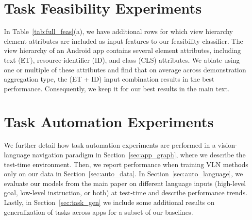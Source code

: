 \section{Task Feasibility Experiments}
\label{sec:feas}
In Table~\ref{tab:full_feas}(a), we have additional rows for which view hierarchy element attributes are included as input features to our feasibility classifier. The view hierarchy of an Android app contains several element attributes, including text (ET), resource-identifier (ID), and class (CLS) attributes. We ablate using one or multiple of these attributes and find that on average across demonstration aggregation type, the (ET + ID) input combination results in the best performance. Consequently, we keep it for our best results in the main text.

\section{Task Automation Experiments}
We further detail how task automation experiments are performed in a vision-language navigation paradigm in Section~\ref{sec:app_graph}, where we describe the test-time environment. Then, we report performance when training VLN methods only on our data in Section~\ref{sec:auto_data}. In Section~\ref{sec:auto_language}, we evaluate our models from the main paper on different language inputs (high-level goal, low-level instruction, or both) at test-time and describe performance trends. Lastly, in Section~\ref{sec:task_gen} we include some additional results on generalization of tasks across apps for a subset of our baselines. 

